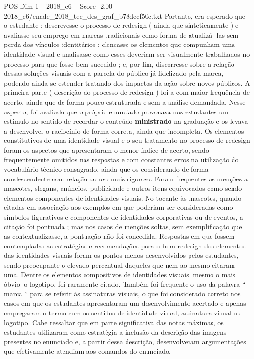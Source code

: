 \begin{textsample}{POS Dim 1 – 2018\_c6 – Score -2.00 – 2018\_c6/enade\_2018\_tec\_des\_graf\_b78dccf50c.txt}
Portanto, era esperado que o estudante : descrevesse o processo de redesign ( ainda que sinteticamente ) e avaliasse seu emprego em marcas tradicionais como forma de atualizá -las sem perda dos vínculos identitários ; elencasse os elementos que compunham uma identidade visual e analisasse como esses deveriam ser visualmente trabalhados no processo para que fosse bem sucedido ; e, por fim, discorresse sobre a relação dessas soluções visuais com a parcela do público já fidelizado pela marca, podendo ainda se estender tratando dos impactos da ação sobre novos públicos.
A primeira parte ( descrição do processo de redesign ) foi a com maior frequência de acerto, ainda que de forma pouco estruturada e sem a análise demandada.
Nesse aspecto, foi avaliado que o próprio enunciado provocava nos estudantes um estímulo no sentido de recordar o conteúdo \textbf{ministrado} na graduação e os levava a desenvolver o raciocínio de forma correta, ainda que incompleta.
Os elementos constitutivos de uma identidade visual e o seu tratamento no processo de redesign foram os aspectos que apresentaram o menor índice de acerto, sendo frequentemente omitidos nas respostas e com constantes erros na utilização do vocabulário técnico consagrado, ainda que os considerando de forma condescendente com relação ao uso mais rigoroso.
Foram frequentes as menções a mascotes, slogans, anúncios, publicidade e outros itens equivocados como sendo elementos componentes de identidades visuais.
No tocante às mascotes, quando citadas em associação aos exemplos em que poderiam ser consideradas como símbolos figurativos e componentes de identidades corporativas ou de eventos, a citação foi pontuada ; mas nos casos de menções soltas, sem exemplificação que as contextualizasse, a pontuação não foi concedida.
Respostas em que fossem contempladas as estratégias e recomendações para o bom redesign dos elementos das identidades visuais foram os pontos menos desenvolvidos pelos estudantes, sendo preocupante o elevado percentual daqueles que nem ao mesmo citaram uma.
Dentre os elementos compositivos de identidades visuais, mesmo o mais óbvio, o logotipo, foi raramente citado.
Também foi frequente o uso da palavra “ marca ” para se referir às assinaturas visuais, o que foi considerado correto nos casos em que os estudantes apresentaram um desenvolvimento acertado e apenas empregaram o termo com os sentidos de identidade visual, assinatura visual ou logotipo.
Cabe ressaltar que em parte significativa das notas máximas, os estudantes utilizaram como estratégia a inclusão da descrição das imagens presentes no enunciado e, a partir dessa descrição, desenvolveram argumentações que efetivamente atendiam aos comandos do enunciado.

\end{textsample}
